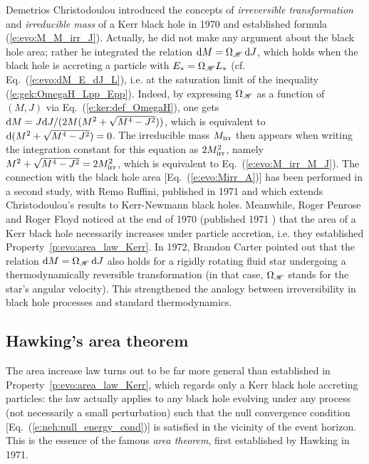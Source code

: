\begin{hist}
\label{h:evo:irreducible_mass}
Demetrios Christodoulou introduced the
concepts of \emph{irreversible transformation} and \emph{irreducible mass} of a Kerr black
hole in 1970 \cite{Chris70} and established formula (\ref{e:evo:M_M_irr_J}).
Actually, he did not make any argument about the black hole area; rather he
integrated the relation $\mathrm{d} M = \Omega_{\mathscr{H}} \, \mathrm{d} J$, which holds when
the black hole is accreting a particle with $E_* = \Omega_{\mathscr{H}} L_*$ (cf. Eq.~(\ref{e:evo:dM_E_dJ_L}), i.e.
at the saturation limit of the inequality (\ref{e:gek:OmegaH_Lpp_Epp}). Indeed, by expressing
$\Omega_{\mathscr{H}}$ as a function of $(M,J)$ via Eq.~(\ref{e:ker:def_OmegaH}),
one gets $\mathrm{d} M = J\mathrm{d} J/(2M(M^2 + \sqrt{M^4 - J^2}))$, which is equivalent
to $\mathrm{d}(M^2 + \sqrt{M^4 - J^2}) = 0$.
The irreducible mass $M_{\rm irr}$
then appears when writing the integration constant for this equation as $2 M_{\rm irr}^2$,
namely $M^2 + \sqrt{M^4 - J^2} = 2 M_{\rm irr}^2$, which is equivalent to Eq.~(\ref{e:evo:M_irr_M_J}).
The connection with the black hole area [Eq.~(\ref{e:evo:Mirr_A})] has been
performed in a second study, with Remo Ruffini, published in 1971
\cite{ChrisR71} and which extends Christodoulou's results to Kerr-Newmann
black holes. Meanwhile,
Roger Penrose
and Roger Floyd noticed at the end of 1970 (published 1971 \cite{PenroF71})
that the area of a Kerr black hole necessarily increases under particle accretion, i.e.
they established Property~\ref{p:evo:area_law_Kerr}.
In 1972, Brandon Carter \cite{Carte72} pointed out that the relation
$\mathrm{d} M = \Omega_{\mathscr{H}} \, \mathrm{d} J$ also holds for a rigidly rotating fluid star undergoing a
thermodynamically reversible transformation (in that case, $\Omega_{\mathscr{H}}$ stands for
the star's angular velocity). This strengthened the analogy between irreversibility in
black hole processes and standard thermodynamics.
\end{hist}

\subsection{Hawking's area theorem}

The area increase law turns out to be far
more general than established in Property~\ref{p:evo:area_law_Kerr},
which regards only a Kerr black hole accreting particles:
the law actually applies to any black hole evolving under
any process (not necessarily a small perturbation) such that the null convergence condition
[Eq.~(\ref{e:neh:null_energy_cond})]
is satisfied in the vicinity of the event horizon.
This is the essence of the famous \emph{area theorem}, first established
by Hawking in 1971.

